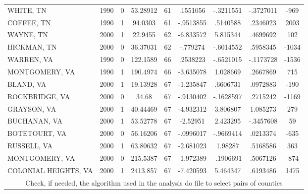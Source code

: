 \documentclass[a4paper,12pt]{article}
\begin{document}
\begin{landscape}
\begin{small}
\begin{center}
\begin{longtable}{lcccccccc}
WHITE, TN&1990&0&53.28912&61&.1551056&-.3211551&-.3727011&-969 \\
COFFEE, TN&1990&1&94.0303&61&-.9513855&.5140588&.2346023&2003 \\ \hline
WAYNE, TN&2000&1&22.9455&62&-6.833572&5.815344&.4699692&102 \\
HICKMAN, TN&2000&0&36.37031&62&-.779274&-.6014552&.5958345&-1034 \\ \hline
WARREN, VA&1990&0&122.1589&66&.2538223&-.6521015&-.1173728&-1536 \\
MONTGOMERY, VA&1990&1&190.4974&66&-3.635078&1.028669&.2667869&715 \\ \hline
BLAND, VA&2000&1&19.13928&67&-1.235847&.6606731&.0972883&-190 \\
ROCKBRIDGE, VA&2000&0&34.68&67&-.9130402&-.1628597&.2715242&-1169 \\
GRAYSON, VA&2000&1&40.44469&67&-4.932312&3.806807&1.085273&279 \\
BUCHANAN, VA&2000&1&53.52778&67&-2.52951&2.423295&-.3457608&59 \\
BOTETOURT, VA&2000&0&56.16206&67&-.0996017&-.9669414&.0213374&-635 \\
RUSSELL, VA&2000&1&63.80632&67&-2.681023&1.98287&.5168586&363 \\
MONTGOMERY, VA&2000&0&215.5387&67&-1.972389&-.1906691&.5067126&-874 \\
COLONIAL HEIGHTS, VA&2000&1&2413.857&67&-7.420593&5.464347&.6193486&1475 \\ \hline
\multicolumn{9}{c}{Check, if needed, the algorithm used in the analysis do file to select pairs of counties} \\
\end{longtable}
\end{center}
\end{small}
\end{landscape}
\end{document}
